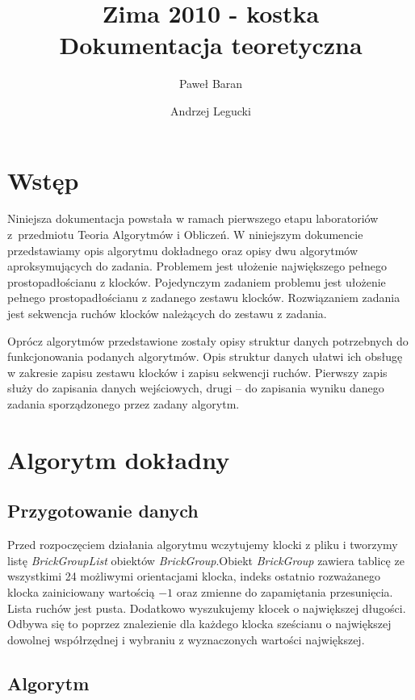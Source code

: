 \documentclass[12pt]{article}
\title{
\Huge{
Zima 2010 - kostka
} \\[0.5em]
\LARGE{
Dokumentacja teoretyczna
}
}
\author{
	Paweł Baran \and Andrzej Legucki
}
\begin{document}
\maketitle

\newpage

\tableofcontents

\newpage
\section{Wstęp}
Niniejsza dokumentacja powstała w ramach pierwszego etapu laboratoriów
z~przedmiotu Teoria Algorytmów i Obliczeń. W niniejszym dokumencie
przedstawiamy opis algorytmu dokładnego oraz opisy dwu algorytmów
aproksymujących do zadania. Problemem jest ułożenie największego
pełnego prostopadłościanu z klocków. Pojedynczym zadaniem problemu jest
ułożenie pełnego prostopadłościanu z zadanego zestawu klocków.
Rozwiązaniem zadania jest sekwencja ruchów klocków należących do zestawu
z zadania.

Oprócz algorytmów przedstawione zostały opisy struktur danych potrzebnych
do funkcjonowania podanych algorytmów. Opis struktur danych ułatwi ich
obsługę w zakresie zapisu zestawu klocków i zapisu sekwencji ruchów.
Pierwszy zapis służy do zapisania danych wejściowych, drugi -- do zapisania
wyniku danego zadania sporządzonego przez zadany algorytm.

\section{Algorytm dokładny}
\subsection{Przygotowanie danych}
Przed rozpoczęciem działania algorytmu wczytujemy klocki z pliku i tworzymy listę \textit{BrickGroupList} obiektów
\textit{BrickGroup}.Obiekt \textit{BrickGroup} zawiera tablicę ze wszystkimi 24 możliwymi orientacjami
klocka, indeks ostatnio rozważanego klocka zainiciowany wartością $-1$ oraz zmienne do zapamiętania przesunięcia.
Lista ruchów jest pusta. Dodatkowo wyszukujemy klocek o największej długości. Odbywa się to poprzez znalezienie
dla każdego klocka sześcianu o największej dowolnej współrzędnej i  wybraniu z wyznaczonych wartości największej. 
\subsection{Algorytm}
\end{document}
